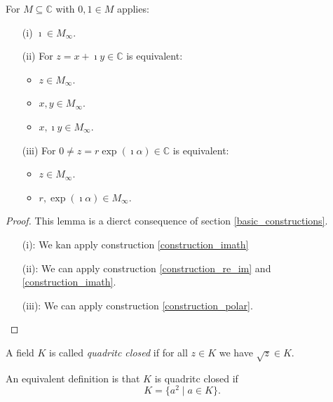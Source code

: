 \begin{lemma}
    \label{lem:M_inf_properties}
    \leanok
    For $M\subseteq \mathbb{C}$ with $0,1 \in M$ applies:
    \begin{itemize}
        \item[(i)] $\imath \in M_{\infty}$.
        \item[(ii)] For $z = x + \imath y \in \mathbb{C}$ is equivalent:
            \begin{itemize}
                \item $z \in M_{\infty}$.
                \item $x, y \in M_{\infty}$.
                \item $x, \imath y \in M_{\infty}$.
            \end{itemize}
        \item[(iii)] 
            For $0 \ne z = r \exp(\imath \alpha) \in \mathbb{C}$ is equivalent:
            \begin{itemize}
                \item $z \in M_{\infty}$.
                \item $r,\exp(\imath \alpha) \in M_{\infty}$.
            \end{itemize}
    \end{itemize}
\end{lemma}
\begin{proof}
    This lemma is a dierct consequence of section \ref{basic_constructions}.
    \begin{itemize}
        \item[(i):] We kan apply construction \ref{construction_imath}
        \item[(ii):] We can apply construction \ref{construction_re_im} and \ref{construction_imath}.
        \item[(iii):]  We can apply construction \ref{construction_polar}.
    \end{itemize}
\end{proof}

\begin{definition}
    \label{def:quadritc_closed_field}
    \leanok
    A field $K$ is called \emph{quadritc closed} if for all $z \in K$ we have $\sqrt{z} \in K$.
\end{definition}
\begin{remark}
    An equivalent definition is that $K$ is quadritc closed if $$K=\{a^2\mid a \in K\}.$$ 
\end{remark}

